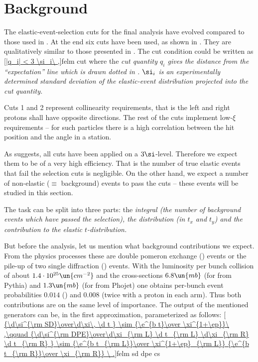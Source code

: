 \section[felm bckg]{Background}

The elastic-event-selection cuts for the final analysis have evolved compared to those used in . At the end six cuts have been used, as shown in . They are qualitatively similar to those presented in . The cut condition could be written as
\eqref{|q_i| < 3 \si_i\ ,}{felm cut}
where the \em{cut quantity} $q_i$ gives the distance from the ``expectation'' line which is drawn dotted in . $\si_i$ is an experimentally determined standard deviation of the elastic-event distribution projected into the cut quantity.

Cuts 1 and 2 represent collinearity requirements, that is the left and right protons shall have opposite directions. The rest of the cuts implement low-$\xi$ requirements -- for such particles there is a high correlation between the hit position and the angle in a station.


As  suggests, all cuts have been applied on a $3\si$-level. Therefore we expect them to be of a very high efficiency. That is the number of true elastic events that fail the selection cuts is negligible. On the other hand, we expect a number of non-elastic ($\equiv$ background) events to pass the cuts -- these events will be studied in this section.

The task can be split into three parts: the \em{integral} (the number of background events which have passed the selection), the \em{distribution} (in $t_x$ and $t_y$) and the \em{contribution to the elastic $t$-distribution}.

But before the analysis, let us mention what background contributions we expect. From the physics processes these are double pomeron exchange () events or the pile-up of two single diffraction () events. With the luminosity per bunch collision of about $1.4\cdot10^{25}\un{cm^{-2}}$ and the cross-sections $6.8\un{mb}$ (for  from Pythia) and $1.3\un{mb}$ (for  from Phojet) one obtains per-bunch event probabilities $0.014$ () and $0.008$ (twice  with a proton in each arm). Thus both contributions are on the same level of importance. The output of the mentioned  generators can be, in the first approximation, parameterized as follows:
\eqref{
{\d\si^{\rm SD}\over\d\xi\, \d t } \sim {\e^{b t}\over \xi^{1+\ep}}\ ,\qquad
{\d\si^{\rm DPE}\over\d\xi_{\rm L} \d t_{\rm L} \d\xi_{\rm R} \d t_{\rm R} } \sim {\e^{b t_{\rm L}}\over \xi^{1+\ep}_{\rm L}} {\e^{b t_{\rm R}}\over \xi_{\rm R}}
\ .}{felm sd dpe cs}

